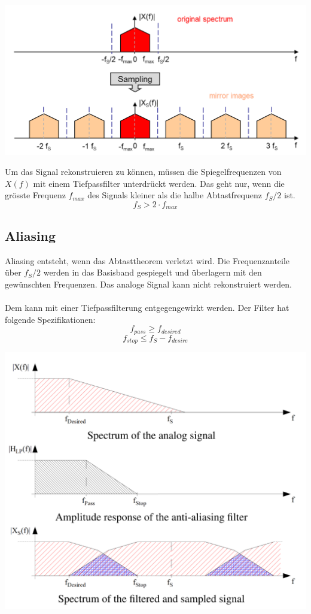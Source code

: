 \begin{center}
	\includegraphics[scale=.7]{../fig/frequenz_spectrum}
\end{center}
Um das Signal rekonstruieren zu können, müssen die Spiegelfrequenzen von $X(f)$
mit einem Tiefpassfilter unterdrückt werden. Das geht nur, wenn die grösste
Frequenz $f_{max}$ des Signals kleiner als die halbe Abtastfrequenz $f_S/2$ ist.
\[ f_S > 2 \cdot f_{max} \]

\subsection{Aliasing}
Aliasing entsteht, wenn das Abtasttheorem verletzt wird. Die Frequenzanteile
über $f_S/2$ werden in das Basisband gespiegelt und überlagern mit den 
gewünschten Frequenzen. Das analoge Signal kann nicht rekonstruiert werden.\\
\\
Dem kann mit einer Tiefpassfilterung entgegengewirkt werden. Der Filter hat
folgende Spezifikationen:
\[ f_{pass} \geq f_{desired} \]
\[ f_{stop} \leq f_S - f_{desire} \]

\begin{center}
	\includegraphics[scale=.7]{../fig/aliasing}
\end{center}

